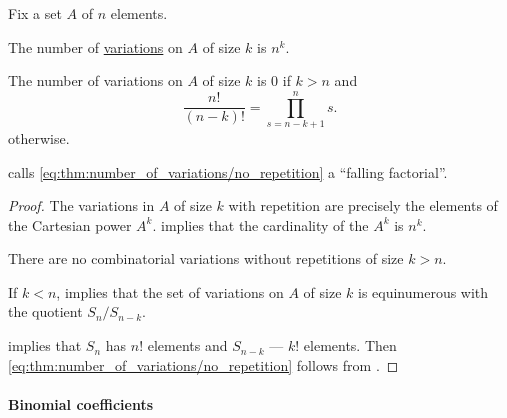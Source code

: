 \begin{proposition}\label{thm:number_of_variations}
  Fix a set \( A \) of \( n \) elements.

  \begin{thmenum}
     The number of \hyperref[def:combinatorial_variation]{variations} on \( A \) of size \( k \)  is \( n^k \).

     The number of variations on \( A \) of size \( k \)  is \( 0 \) if \( k > n \) and
    \begin{equation}\label{eq:thm:number_of_variations/no_repetition}
      \frac {n!} {(n - k)!} = \prod_{s=n - k + 1}^n s.
    \end{equation}
    otherwise.
  \end{thmenum}
\end{proposition}
\begin{comments}
  \item {} calls \eqref{eq:thm:number_of_variations/no_repetition} a \enquote{falling factorial}.
\end{comments}
\begin{proof}
   The variations in \( A \) of size \( k \) with repetition are precisely the elements of the Cartesian power \( A^k \).  implies that the cardinality of the \( A^k \) is \( n^k \).

   There are no combinatorial variations without repetitions of size \( k > n \).

  If \( k < n \),  implies that the set of variations on \( A \) of size \( k \) is equinumerous with the quotient \( S_n / S_{n - k} \).

   implies that \( S_n \) has \( n! \) elements and \( S_{n - k} \) --- \( k! \) elements. Then \eqref{eq:thm:number_of_variations/no_repetition} follows from .
\end{proof}

\paragraph{Binomial coefficients}

